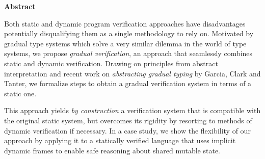 \begin{center}
\begin{minipage}{0.7\textwidth}
\vspace*{15\baselineskip}
\begin{center}
\textbf{Abstract}
\end{center}
Both static and dynamic program verification approaches have disadvantages potentially disqualifying them as a single methodology to rely on.
Motivated by gradual type systems which solve a very similar dilemma in the world of type systems, we propose \textit{gradual verification}, an approach that seamlessly combines static and dynamic verification.
Drawing on principles from abstract interpretation and recent work on \textit{abstracting gradual typing} by Garcia, Clark and Tanter, we formalize steps to obtain a gradual verification system in terms of a static one.

This approach yields \textit{by construction} a verification system that is compatible with the original static system, but overcomes its rigidity by resorting to methods of dynamic verification if necessary.
In a case study, we show the flexibility of our approach by applying it to a statically verified language that uses implicit dynamic frames to enable safe reasoning about shared mutable state.
\end{minipage}
\end{center}
